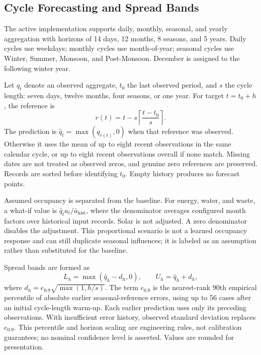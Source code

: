 \documentclass[conference]{IEEEtran}
\begin{document}
\subsection{Cycle Forecasting and Spread Bands}
The active implementation supports daily, monthly, seasonal, and yearly aggregation with horizons of 14 days, 12 months, 8 seasons, and 5 years. Daily cycles use weekdays; monthly cycles use month-of-year; seasonal cycles use Winter, Summer, Monsoon, and Post-Monsoon. December is assigned to the following winter year.

Let $q_t$ denote an observed aggregate, $t_0$ the last observed period, and $s$ the cycle length: seven days, twelve months, four seasons, or one year. For target $t=t_0+h$, the reference is
\begin{equation}
r(t)=t-s\left\lceil\frac{t-t_0}{s}\right\rceil.
\end{equation}
The prediction is $\widehat q_t=\max(q_{r(t)},0)$ when that reference was observed. Otherwise it uses the mean of up to eight recent observations in the same calendar cycle, or up to eight recent observations overall if none match. Missing dates are not treated as observed zeros, and genuine zero references are preserved. Records are sorted before identifying $t_0$. Empty history produces no forecast points.

Assumed occupancy is separated from the baseline. For energy, water, and waste, a what-if value is $\widehat q_t a_t/\bar a_{\mathrm{hist}}$, where the denominator averages configured month factors over historical input records. Solar is not adjusted. A zero denominator disables the adjustment. This proportional scenario is not a learned occupancy response and can still duplicate seasonal influences; it is labeled as an assumption rather than substituted for the baseline.

Spread bands are formed as
\begin{equation}
L_h=\max(\widehat q_h-d_h,0),\qquad U_h=\widehat q_h+d_h,
\end{equation}
where $d_h=e_{0.9}\sqrt{\max(1,h/s)}$. The term $e_{0.9}$ is the nearest-rank 90th empirical percentile of absolute earlier seasonal-reference errors, using up to 56 cases after an initial cycle-length warm-up. Each earlier prediction uses only its preceding observations. With insufficient error history, observed standard deviation replaces $e_{0.9}$. This percentile and horizon scaling are engineering rules, not calibration guarantees; no nominal confidence level is asserted. Values are rounded for presentation.
\end{document}
